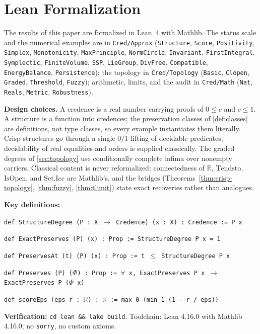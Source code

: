 \documentclass[11pt,a4paper]{article}
\newcommand{\Real}{\mathbb{R}}
\begin{document}



\appendix

\section{Lean Formalization}
\label{app:lean}

The results of this paper are formalized in Lean~4 with Mathlib.
The status scale and the numerical examples are in
\texttt{Cred/Approx} (\texttt{Structure}, \texttt{Score},
\texttt{Positivity}, \texttt{Simplex}, \texttt{Monotonicity},
\texttt{MaxPrinciple}, \texttt{NormCircle}, \texttt{Invariant},
\texttt{FirstIntegral}, \texttt{Symplectic}, \texttt{FiniteVolume},
\texttt{SSP}, \texttt{LieGroup}, \texttt{DivFree},
\texttt{Compatible}, \texttt{EnergyBalance}, \texttt{Persistence});
the topology in \texttt{Cred/Topology} (\texttt{Basic},
\texttt{Clopen}, \texttt{Graded}, \texttt{Threshold},
\texttt{Fuzzy}); arithmetic, limits, and the audit in
\texttt{Cred/Math} (\texttt{Nat}, \texttt{Reals}, \texttt{Metric},
\texttt{Robustness}).

\textbf{Design choices.}
A credence is a real number carrying proofs of $0 \le c$ and
$c \le 1$.
A structure is a function into credences; the preservation classes of
\cref{def:classes} are definitions, not type classes, so every example
instantiates them literally.
Crisp structures go through a single $0/1$ lifting of decidable
predicates; decidability of real equalities and orders is supplied
classically.
The graded degrees of \cref{sec:topology} use conditionally complete
infima over nonempty carriers.
Classical content is never reformalized: connectedness of $\Real$,
$\mathrm{Tendsto}$, $\mathrm{IsOpen}$, and
$\mathrm{Set.Icc}$ are Mathlib's, and the bridges
(Theorems~\ref{thm:crisp-topology}, \ref{thm:fuzzy},
\ref{thm:tlimit}) state exact recoveries rather than analogues.

\textbf{Key definitions:}

\medskip
\noindent
\texttt{def StructureDegree (P : X $\to$ Credence) (x : X) : Credence := P x}

\medskip
\noindent
\texttt{def ExactPreserves (P) (x) : Prop := StructureDegree P x = 1}

\medskip
\noindent
\texttt{def PreservesAt (t) (P) (x) : Prop := t $\le$ StructureDegree P x}

\medskip
\noindent
\texttt{def Preserves (P) ($\Phi$) : Prop := $\forall$ x, ExactPreserves P x $\to$ ExactPreserves P ($\Phi$ x)}

\medskip
\noindent
\texttt{def scoreEps (eps r : $\Real$) : $\Real$ := max 0 (min 1 (1 - r / eps))}

\medskip
\textbf{Verification:} \texttt{cd lean \&\& lake build}.
Toolchain: Lean 4.16.0 with Mathlib 4.16.0; no \texttt{sorry}, no
custom axioms.
\end{document}
